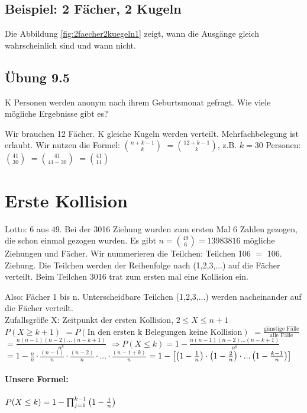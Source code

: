 \subsection{Beispiel: 2 Fächer, 2 Kugeln}
Die Abbildung \ref{fig:2faecher2kuegeln1} zeigt, wann die Ausgänge gleich wahrscheinlich sind und wann nicht.

\subsection{Übung 9.5}
K Personen werden anonym nach ihrem Geburtsmonat gefragt. Wie viele mögliche Ergebnisse gibt es? 

Wir brauchen 12 Fächer. K gleiche Kugeln werden verteilt. Mehrfachbelegung ist erlaubt. 
Wir nutzen die Formel: $\binom{n+k-1}{k}$
$= \binom{12+k-1}{k}$, z.B. $k=30$ Personen: 
$\binom{41}{30}$
$= \binom{41}{41-30}$
$=\binom{41}{11}$

\section{Erste Kollision}
Lotto: 6 aus 49. Bei der 3016 Ziehung wurden zum ersten Mal 6 Zahlen gezogen, die schon einmal gezogen wurden. Es gibt $n=\binom{49}{6}=13 983 816$ mögliche Ziehungen und Fächer. Wir nummerieren die Teilchen: Teilchen 106 $=$ 106. Ziehung. Die Teilchen werden der Reihenfolge nach (1,2,3,...) auf die Fächer verteilt. Beim Teilchen 3016 trat zum ersten mal eine Kollision ein. 

Also: Fächer 1 bis n. Unterscheidbare Teilchen (1,2,3,...) werden nacheinander auf die Fächer verteilt. \\
Zufallsgröße X: Zeitpunkt der ersten Kollision, $2\leq X \leq n+1$\\
$P(X\geq k+1) $
$= P(\textrm{In den ersten k Belegungen keine Kollision})$
$= \frac{\textrm{günstige Fälle}}{\textrm{alle Fälle}}$
$= \frac{n(n-1)(n-2) ... (n-k+1)}{n^k}$
$\Rightarrow P(X \leq k) = 1-\frac{n(n-1)(n-2) ... (n-k+1)}{n^k}$
$= 1 - \frac{n}{n} \cdot \frac{(n-1)}{n} \cdot \frac{(n-2)}{n} \cdot ... \cdot \frac{(n-1+k)}{n}$
$= 1 -  \left[  \left( 1-\frac{1}{n} \right)  \cdot  \left( 1-\frac{2}{n} \right)  \cdot ...  \left( 1-\frac{k-1}{n} \right)  \right]   $

\paragraph{Unsere Formel:}
$P(X\leq k) = 1 - \prod_{j=1}^{k-1}  \left( 1-\frac{j}{n} \right) $

